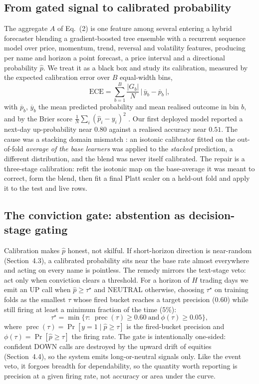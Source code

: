 \documentclass[12pt,a4paper]{article}
\begin{document}
\subsection{From gated signal to calibrated probability}

The aggregate $A$ of Eq.~(2) is one feature among several entering a hybrid
forecaster blending a gradient-boosted tree ensemble with a recurrent sequence model
over price, momentum, trend, reversal and volatility features, producing per name
and horizon a point forecast, a price interval and a directional probability
$\hat p$. We treat it as a black box and study its calibration, measured by the
expected calibration error over $B$ equal-width bins,
\begin{equation}
\mathrm{ECE}=\sum_{b=1}^{B}\frac{|G_b|}{N}\,\big|\,\overline{y}_b-\overline{p}_b\,\big|,
\end{equation}
with $\overline{p}_b$, $\overline{y}_b$ the mean predicted probability and mean
realised outcome in bin $b$, and by the Brier score
$\frac1N\sum_i(\hat p_i-y_i)^2$ \cite{brier1950}. Our first deployed model reported
a next-day up-probability near $0.80$ against a realised accuracy near $0.51$. The
cause was a stacking domain mismatch \cite{wolpert1992}: an isotonic calibrator
fitted on the out-of-fold \emph{average of the base learners} was applied to the
\emph{stacked} prediction, a different distribution, and the blend was never itself
calibrated. The repair is a three-stage calibration: refit the isotonic map on the
base-average it was meant to correct, form the blend, then fit a final Platt scaler
\cite{platt1999} on a held-out fold and apply it to the test and live rows.

\subsection{The conviction gate: abstention as decision-stage gating}

Calibration makes $\hat p$ honest, not skilful. If short-horizon direction is
near-random (Section~4.3), a calibrated probability sits near the base rate almost
everywhere and acting on every name is pointless. The remedy mirrors the text-stage
veto: act only when conviction clears a threshold. For a horizon of $H$ trading days
we emit an UP call when $\hat p\ge\tau^\star$ and NEUTRAL otherwise, choosing
$\tau^\star$ on training folds as the smallest $\tau$ whose fired bucket reaches a
target precision ($0.60$) while still firing at least a minimum fraction of the time
($5\%$):
\begin{equation}
\tau^\star=\min\Big\{\tau:\ \operatorname{prec}(\tau)\ge 0.60\ \text{and}\
\phi(\tau)\ge 0.05\Big\},
\end{equation}
where $\operatorname{prec}(\tau)=\Pr[y=1\mid \hat p\ge\tau]$ is the fired-bucket
precision and $\phi(\tau)=\Pr[\hat p\ge\tau]$ the firing rate. The gate is
intentionally one-sided: confident DOWN calls are destroyed by the upward drift of
equities (Section~4.4), so the system emits long-or-neutral signals only. Like the
event veto, it forgoes breadth for dependability, so the quantity worth reporting is
precision at a given firing rate, not accuracy or area under the curve.
\end{document}
